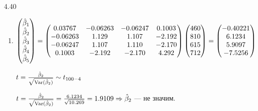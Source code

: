 \begin{solution}{{4.40}}
\begin{enumerate}
\item $\begin{pmatrix}
\hat{\beta}_1 \\
\hat{\beta}_2 \\
\hat{\beta}_3 \\
\hat{\beta}_4 \\
\hat{\beta}_5 \\
\end{pmatrix} = \begin{pmatrix}
0.03767 & -0.06263 & -0.06247 & 0.1003 \\
-0.06263 & 1.129 & 1.107 & -2.192 \\
-0.06247 & 1.107 & 1.110 & -2.170 \\
0.1003 & -2.192 & -2.170 & 4.292 \\
\end{pmatrix} \begin{pmatrix}
460\\
810\\
615\\
712\\
\end{pmatrix} = \begin{pmatrix}
-0.40221 \\
6.1234 \\
5.9097 \\
-7.5256 \\
\end{pmatrix}$

$t = \frac{\hat{\beta}_2}{\sqrt{\operatorname{Var}(\hat{\beta}_2)}} \sim t_{100-4}$

$t = \frac{\hat{\beta}_2}{\sqrt{\operatorname{Var}(\hat{\beta}_2)}} = \frac{6.1234}{\sqrt{10.269}} = 1.9109 \Rightarrow \hat{\beta}_2$ — не значим.
\end{enumerate}
\end{solution}
\protect \hypertarget {soln:4.41}{}
